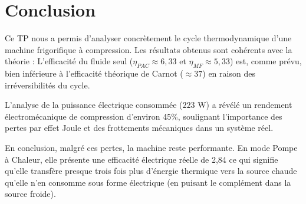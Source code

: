 \documentclass[a4paper,10pt,french]{scrartcl}
\begin{document}
\section{Conclusion}
Ce TP nous a permis d'analyser concrètement le cycle thermodynamique d'une machine frigorifique à compression. 
Les résultats obtenus sont cohérents avec la théorie :
L'efficacité du fluide seul ($\eta_{PAC} \approx 6,33$ et $\eta_{MF} \approx 5,33$) est, comme prévu, bien inférieure à l'efficacité théorique de Carnot ($\approx 37$) en raison des irréversibilités du cycle.

L'analyse de la puissance électrique consommée ($223$ W) a révélé un rendement électromécanique de compression d'environ 45\%, soulignant l'importance des pertes par effet Joule et des frottements mécaniques dans un système réel.




En conclusion, malgré ces pertes, la machine reste performante. En mode Pompe à Chaleur, elle présente une efficacité électrique réelle de 2,84 ce qui signifie qu'elle transfère presque trois fois plus d'énergie thermique vers la source chaude qu'elle n'en consomme sous forme électrique (en puisant le complément dans la source froide).
\end{document}
